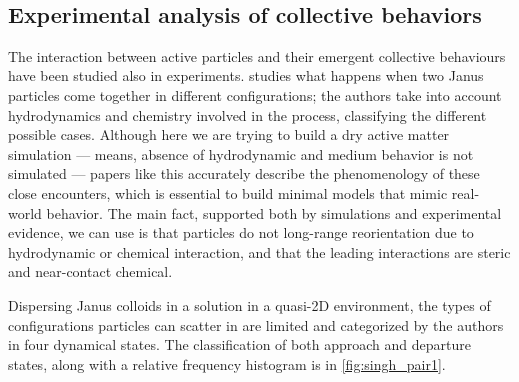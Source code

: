 \documentclass[../../master_thesis_np.tex]{subfiles}
\begin{document}
	\begin{figure}[htp]
		\centering
		 \\
		\caption{\cite{negi_emergent_2022}}
		\label{fig:negi_vision2}
	\end{figure}
	
	\subsection{Experimental analysis of collective behaviors}
	The interaction between active particles and their emergent collective behaviours have been studied also in experiments. 
	\cite{singh_pair_2024} studies what happens when two  Janus particles come together in different configurations; the authors take into account hydrodynamics and chemistry involved in the process, classifying the different possible cases. 
	Although here we are trying to build a dry active matter simulation --- means, absence of hydrodynamic and medium behavior is not simulated --- papers like this accurately describe the phenomenology of these close encounters, which is essential to build minimal models that mimic real-world behavior. 
	The main fact, supported both by simulations and experimental evidence, we can use is that particles do not long-range reorientation due to hydrodynamic or chemical interaction, and that the leading interactions are steric and near-contact chemical.
	
	Dispersing Janus colloids in a  solution in a quasi-2D environment, the types of configurations particles can scatter in are limited and categorized by the authors in four dynamical states. 
	The classification of both approach and departure states, along with a relative frequency histogram is in \ref{fig:singh_pair1}.
	
\end{document}
